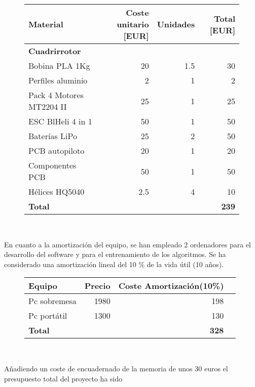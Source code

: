 \begin{figure}[htb!]
	\centering
	\begin{tabular}{|l|r|r|r|}
		\hline
		\textbf{Material} &Coste unitario [EUR] &Unidades&Total [EUR]\\
		
		\hline
		
		\textbf{Cuadrirrotor}& & &  \\
		Bobina PLA 1Kg & 20 & 1.5 &  30 \\
		Perfiles aluminio & 2 & 1 & 2\\
		Pack 4 Motores MT2204 II & 25 &1& 25 \\
		ESC BlHeli 4 in 1  & 50 & 1 & 50\\
		Baterías LiPo & 25 & 2 & 50\\
		PCB autopiloto & 20 & 1 & 20\\
		Componentes PCB & 50 & 1  & 50 \\
		Hélices HQ5040 &2.5&4&10\\
		\hline
		\textbf{Total} & &  & \textbf{239}\\
		\hline
	\end{tabular}\\
\end{figure}

En cuanto a la amortización del equipo, se han empleado 2 ordenadores para el desarrollo del software y para el entrenamiento de los algoritmos. Se ha considerado una amortización lineal del 10 \% de la vida útil (10 años).

\begin{figure}[htb!]
	\centering
	\begin{tabular}{|l|r|r|r|}
		\hline
		\textbf{Equipo} & Precio &Coste Amortización(10\%)\\
		\hline
		
		Pc sobremesa & 1980 & 198\\
		Pc portátil & 1300 & 130\\
		\hline
		\textbf{Total} & & \textbf{328}\\
		\hline
\end{tabular}\\
\end{figure}

Añadiendo un coste de encuadernado de la memoria de unos 30 euros el presupuesto total del proyecto ha sido



